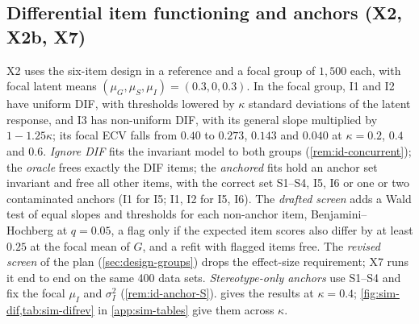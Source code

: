 \subsection{Differential item functioning and anchors (X2, X2b, X7)}\label{sec:sim-dif}

X2 uses the six-item design in a reference and a focal group of $1{,}500$ each, with focal latent means $(\mu_G,\mu_S,\mu_I)=(0.3,0,0.3)$. In the focal group, I1 and I2 have uniform DIF, with thresholds lowered by $\kappa$ standard deviations of the latent response, and I3 has non-uniform DIF, with its general slope multiplied by $1-1.25\kappa$; its focal ECV falls from $0.40$ to $0.273$, $0.143$ and $0.040$ at $\kappa=0.2$, $0.4$ and $0.6$. \emph{Ignore DIF} fits the invariant model to both groups (\cref{rem:id-concurrent}); the \emph{oracle} frees exactly the DIF items; the \emph{anchored} fits hold an anchor set invariant and free all other items, with the correct set S1--S4, I5, I6 or one or two contaminated anchors (I1 for I5; I1, I2 for I5, I6). The \emph{drafted screen} adds a Wald test of equal slopes and thresholds for each non-anchor item, Benjamini--Hochberg at $q=0.05$, a flag only if the expected item scores also differ by at least $0.25$ at the focal mean of $G$, and a refit with flagged items free. The \emph{revised screen} of the plan (\cref{sec:design-groups}) drops the effect-size requirement; X7 runs it end to end on the same 400 data sets. \emph{Stereotype-only anchors} use S1--S4 and fix the focal $\mu_I$ and $\sigma^2_I$ (\cref{rem:id-anchor-S}).  gives the results at $\kappa=0.4$; \cref{fig:sim-dif,tab:sim-difrev} in \cref{app:sim-tables} give them across $\kappa$.

\begin{table}[tbp]
\centering
\caption{X2 and X7, group comparisons under DIF at $\kappa=0.4$ (synthetic data; $1{,}500$ per group; $R=100$, the same data sets in every row). Bias, RMSE and coverage (\%, sandwich 95\% interval) of the focal-minus-reference latent mean differences, and bias of the reference and focal ECV of I3, the item with non-uniform DIF (true values $0.40$ and $0.143$). Drafted screen: Benjamini--Hochberg and an expected-score difference of at least $0.25$ (X2); revised screen: Benjamini--Hochberg alone, the rule of the plan (X7).}
\label{tab:sim-dif}
\footnotesize
\setlength{\tabcolsep}{4.0pt}

\end{table}

